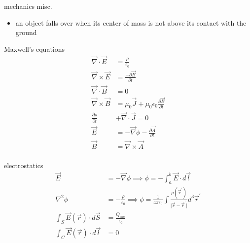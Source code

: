 \documentclass[avery5388, frame]{flashcards}
\begin{document}
\begin{flashcard}{mechanics misc.}
  {
    \begin{itemize}
      \item an object falls over when its center of mass is not above its contact with the ground
    \end{itemize}
  }
\end{flashcard}


\begin{flashcard}{Maxwell's equations}
  {
    \begin{align*}
      \vec{\nabla} \cdot \vec{E} &= \frac{\rho}{\epsilon_{0}}\\
      \vec{\nabla} \times \vec{E} &= \frac{- \partial \vec{B}}{\partial t}\\
      \vec{\nabla} \cdot \vec{B} &= 0\\
      \vec{\nabla} \times \vec{B} &= \mu_{0} \vec{J} + \mu_{0} \epsilon_{0} \frac{\partial \vec{E}}{\partial t}\\
      \frac{\partial \rho}{\partial t} &+ \vec{\nabla} \cdot \vec{J} = 0\\
      \vec{E} &= - \vec{\nabla} \phi - \frac{\partial \vec{A}}{\partial t}\\
      \vec{B} &= \vec{\nabla} \times \vec{A}\\
    \end{align*}
  }
\end{flashcard}

\begin{flashcard}{electrostatics}
  {
    \begin{align*}
      \vec{E} &= -\vec{\nabla} \phi \implies \phi = - \int_{a}^{b} \vec{E} \cdot d\vec{l}\\
      \nabla^{2} \phi &= - \frac{\rho}{\epsilon_{0}} \implies
      \phi = \frac{1}{4 \pi \epsilon_{0}} \int \frac{\rho(\vec{r}^{'})}{\lvert \vec{r} - \vec{r}^{'}\lvert} d^{3}\vec{r}^{'}\\
      \int_{S} \vec{E}(\vec{r}) \cdot d\vec{S} &= \frac{Q_{\textrm{enc}}}{\epsilon_{0}}\\
      \int_{C} \vec{E}(\vec{r}) \cdot d\vec{l} &= 0\\
    \end{align*}
  }
\end{flashcard}
\end{document}
